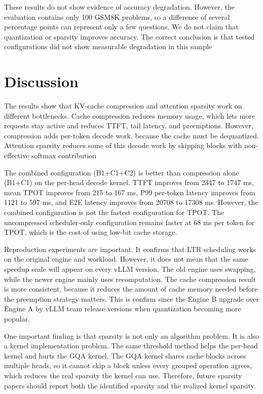 \documentclass[conference]{IEEEtran}
\begin{document}
These results do not show evidence of accuracy degradation. However, the evaluation contains only 100 GSM8K problems, so a difference of several percentage points can represent only a few questions. We do not claim that quantization or sparsity improves accuracy. The correct conclusion is that tested configurations did not show measurable degradation in this sample

\clearpage
\section{Discussion}

The results show that KV-cache compression and attention sparsity work on different bottlenecks. Cache compression reduces memory usage, which lets more requests stay active and reduces TTFT, tail latency, and preemptions. However, compression adds per-token decode work, because the cache must be dequantized. Attention sparsity reduces some of this decode work by skipping blocks with non-effective softmax contribution

The combined configuration (B1+C1+C2) is better than compression alone (B1+C1) on the per-head decode kernel. TTFT improves from 2347 to 1747 ms, mean TPOT improves from 215 to 167 ms, P99 per-token latency improves from 1121 to 597 ms, and E2E latency improves from 20708 to 17308 ms. However, the combined configuration is not the fastest configuration for TPOT. The uncompressed scheduler-only configuration remains faster at 68 ms per token for TPOT, which is the cost of using low-bit cache storage.

Reproduction experiments are important. It confirms that LTR scheduling works on the original engine and workload. However, it does not mean that the same speedup scale will appear on every vLLM version. The old engine uses swapping, while the newer engine mainly uses recomputation. The cache compression result is more consistent, because it reduces the amount of cache memory needed before the preemption strategy matters. This is confirm since the Engine B upgrade over Engine A by vLLM team release versions when quantization becoming more popular.

One important finding is that sparsity is not only an algorithm problem. It is also a kernel implementation problem. The same threshold method helps the per-head kernel and hurts the GQA kernel. The GQA kernel shares cache blocks across multiple heads, so it cannot skip a block unless every grouped operation agrees, which reduces the real sparsity the kernel can use. Therefore, future sparsity papers should report both the identified sparsity and the realized kernel sparsity.
\end{document}
